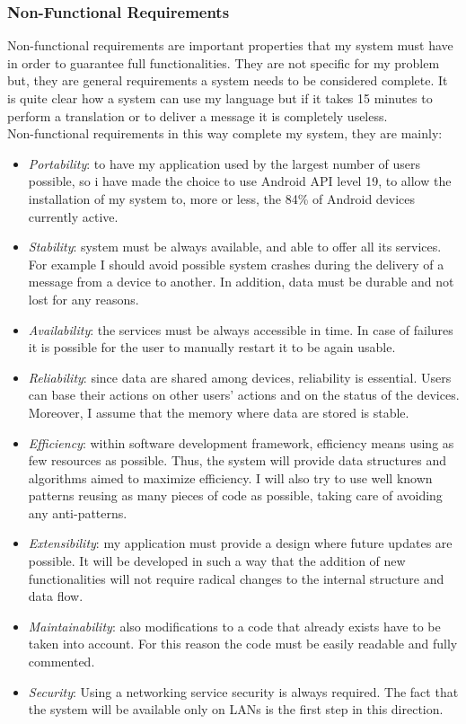 \subsubsection{Non-Functional Requirements}
Non-functional requirements are important properties that my
system must have in order to guarantee full functionalities. They are not specific
for my problem but, they are general requirements a system needs to be considered complete. It is quite clear how a system can use my language but if it takes 15 minutes to perform a translation or to deliver a message it is completely useless.\\
Non-functional requirements in this way complete my system, they are mainly:
\begin{itemize}
	\item \textit{Portability}: to have my application used by the largest number of users
	possible, so i have made the choice to use Android API level 19, to allow the installation of my system to, more or less, the 84\% of Android devices currently active.
	\item \textit{Stability}: system must be always available, and able to offer all its services. For example I should avoid possible system crashes during the delivery of a message from a device to another. In addition, data must be durable and not lost for any reasons.
	\item \textit{Availability}: the services must be always accessible in time. In case of failures it is possible for the user to manually restart it to be again usable.
	\item \textit{Reliability}: since data are shared among devices, reliability is essential. Users can base their actions on other users’ actions and on the status of the devices. Moreover, I assume that the memory where data are stored is stable.
	\item \textit{Efficiency}: within software development framework, efficiency means
	using as few resources as possible. Thus, the system will provide data
	structures and algorithms aimed to maximize efficiency. I will also try to
	use well known patterns reusing as many pieces of code as possible, taking
	care of avoiding any anti-patterns.
	\item \textit{Extensibility}: my application must provide a design where future updates
	are possible. It will be developed in such a way that the addition of new
	functionalities will not require radical changes to the internal structure and
	data flow.
	\item \textit{Maintainability}: also modifications to a code that already exists have to be
	taken into account. For this reason the code must be easily readable and
	fully commented.
	\item \textit{Security}: Using a networking service security is always required. The fact that
	the system will be available only on LANs is the first step in this direction.
\end{itemize}
